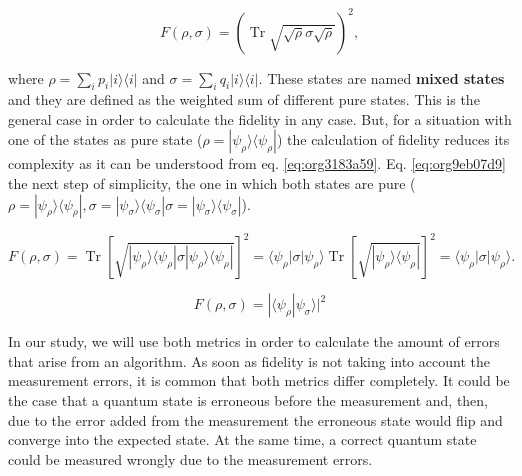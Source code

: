 \begin{equation}
\label{eq:orgbb59b30}
{\displaystyle F(\rho ,\sigma )=\left(\operatorname {Tr} {\sqrt {{\sqrt {\rho }}\sigma {\sqrt {\rho }}}}\right)^{2},}
\end{equation}

where \(\rho =\sum _{i}p_{i}|i\rangle \langle i|\) and \(\sigma =\sum _{i}q_{i}|i\rangle \langle i|\).
These states are named \textbf{mixed states} and they are defined as the weighted sum of different pure states.
This is the general case in order to calculate the fidelity in any case.
But, for a situation with one of the states as pure state (\({\displaystyle \rho =|\psi _{\rho }\rangle \!\langle \psi _{\rho }|}\)) the calculation of fidelity reduces its complexity as it can be understood from eq. \ref{eq:org3183a59}.
Eq. \ref{eq:org9eb07d9} the next step of simplicity, the one in which both states are pure (\({\displaystyle \rho =|\psi _{\rho }\rangle \!\langle \psi _{\rho }|}, {\displaystyle \sigma =|\psi _{\sigma }\rangle \!\langle \psi _{\sigma }|} {\displaystyle \sigma =|\psi _{\sigma }\rangle \!\langle \psi _{\sigma }|}\)).


\begin{equation}
\label{eq:org3183a59}
{\displaystyle F(\rho ,\sigma )=\operatorname {Tr} \left[{\sqrt {|\psi _{\rho }\rangle \langle \psi _{\rho }|\sigma |\psi _{\rho }\rangle \langle \psi _{\rho }|}}\right]^{2}=\langle \psi _{\rho }|\sigma |\psi _{\rho }\rangle \operatorname {Tr} \left[{\sqrt {|\psi _{\rho }\rangle \langle \psi _{\rho }|}}\right]^{2}=\langle \psi _{\rho }|\sigma |\psi _{\rho }\rangle .}
\end{equation}

\begin{equation}
\label{eq:org9eb07d9}
{\displaystyle F(\rho ,\sigma )=|\langle \psi _{\rho }|\psi _{\sigma }\rangle |^{2}}
\end{equation}




In our study, we will use both metrics in order to calculate the amount of errors that arise from an algorithm.
As soon as fidelity is not taking into account the measurement errors, it is common that both metrics differ completely.
It could be the case that a quantum state is erroneous before the measurement and, then, due to the error added from the measurement the erroneous state would flip and converge into the expected state.
At the same time, a correct quantum state could be measured wrongly due to the measurement errors.

